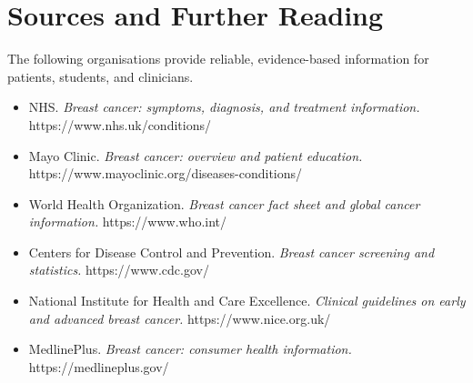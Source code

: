 \section*{Sources and Further Reading}
The following organisations provide reliable, evidence-based information for patients, students, and clinicians.

\begin{itemize}
    \item NHS. \textit{Breast cancer: symptoms, diagnosis, and treatment information.} https://www.nhs.uk/conditions/
    \item Mayo Clinic. \textit{Breast cancer: overview and patient education.} https://www.mayoclinic.org/diseases-conditions/
    \item World Health Organization. \textit{Breast cancer fact sheet and global cancer information.} https://www.who.int/
    \item Centers for Disease Control and Prevention. \textit{Breast cancer screening and statistics.} https://www.cdc.gov/
    \item National Institute for Health and Care Excellence. \textit{Clinical guidelines on early and advanced breast cancer.} https://www.nice.org.uk/
    \item MedlinePlus. \textit{Breast cancer: consumer health information.} https://medlineplus.gov/
\end{itemize}
